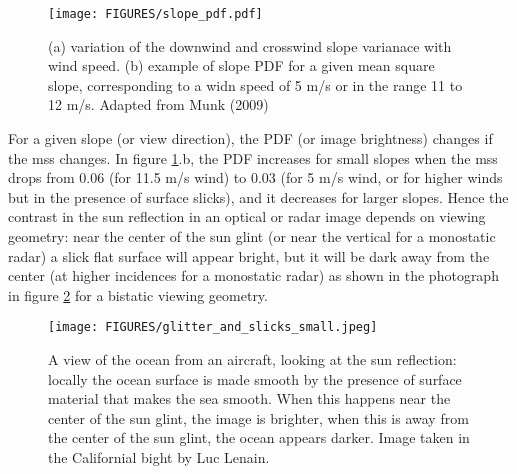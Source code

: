 \begin{figure}[htb]
\centerline{\texttt{[image: FIGURES/slope\_pdf.pdf]}}
\caption[]
{(a) variation of the downwind and crosswind slope varianace with wind speed. (b) example of slope PDF for a given mean square slope, corresponding to a widn speed of 5 m/s or in the range 11 to 12 m/s. Adapted from Munk (2009) \label{fig:slope_pdf}}
\end{figure}

For a given slope (or view direction), the PDF (or image brightness) changes if the mss changes. In figure \ref{fig:slope_pdf}.b, the PDF increases for small slopes when the mss drops from 0.06 (for 11.5 m/s wind) to 0.03 (for 5 m/s wind, or for higher winds but in the presence of surface slicks), and it decreases for larger slopes. 
 Hence the contrast in the sun reflection in an optical or radar image depends 
on viewing geometry: near the center of the sun glint (or near the vertical for a monostatic radar) a slick flat surface will appear bright, but it will be dark away from the center (at higher incidences for a monostatic radar) as shown in the photograph in figure \ref{fig:slicks} for a bistatic viewing geometry.
\begin{figure}[htb]
\centerline{\texttt{[image: FIGURES/glitter\_and\_slicks\_small.jpeg]}}
\caption[]{A view of the ocean from an aircraft, looking at the sun reflection: locally the ocean surface is made smooth by the presence of surface material that makes the sea smooth. When this happens near the center of the sun glint, the image is brighter, when this is away from the center of the sun glint, the ocean appears darker. Image taken in the Californial bight by Luc Lenain. \label{fig:slicks}}
\end{figure}

